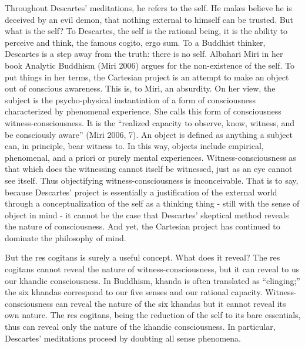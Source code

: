 \documentclass[leqno]{article}
\begin{document}
	Throughout Descartes’ meditations, he refers to the self. He makes believe he
	is deceived by an evil demon, that nothing external to himself can be trusted.
	But what is the self? To Descartes, the self is the rational being, it is the ability
	to perceive and think, the famous cogito, ergo sum. To a Buddhist thinker, Descartes
	is a step away from the truth: there is no self. Albahari Miri in her book Analytic
	Buddhism (Miri 2006) argues for the non-existence of the self. To put things
	in her terms, the Cartesian project is an attempt to make an object out of conscious
	awareness. This is, to Miri, an absurdity. On her view, the subject is the
	psycho-physical instantiation of a form of consciousness characterized by
	phenomenal experience. She calls this form of consciousness witness-consciousness.
	It is the “realized capacity to observe, know, witness, and be consciously aware”
	(Miri 2006, 7). An object is defined as anything a subject can, in principle, bear
	witness to. In this way, objects include empirical, phenomenal, and a priori or
	purely mental experiences. Witness-consciousness as that which does the
	witnessing cannot itself be witnessed, just as an eye cannot see itself. Thus
	objectifying witness-consciousness is inconceivable. That is to say, because
	Descartes’ project is essentially a justification of the external world
	through a conceptualization of the self as a thinking thing - still with the
	sense of object in mind - it cannot be the case that Descartes’ skeptical
	method reveals the nature of consciousness. And yet, the Cartesian project has
	continued to dominate the philosophy of mind.

	But the res cogitans is surely a useful concept. What does it reveal? The res
	cogitans cannot reveal the nature of witness-consciousness, but it can reveal to
	us our khandic consciousness. In Buddhism, khanda is often translated as “clinging;”
	the six khandas correspond to our five senses and our rational capacity.
	Witness-consciousness can reveal the nature of the six khandas but it cannot
	reveal its own nature. The res cogitans, being the reduction of the self to
	its bare essentials, thus can reveal only the nature of the khandic consciousness.
	In particular, Descartes’ meditations proceed by doubting all sense phenomena.
\end{document}
